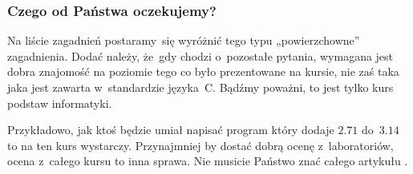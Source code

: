 \documentclass[10pt,t]{beamer}
\begin{document}
\begin{frame}
  \frametitle{Czego od Państwa oczekujemy?}


  Na liście zagadnień postaramy~się wyróżnić tego typu „powierzchowne”
  zagadnienia. Dodać należy, że~gdy chodzi o~pozostałe pytania, wymagana
  jest dobra znajomość na \alert{poziomie tego co było prezentowane na
    kursie}, nie zaś taka jaka jest zawarta w~standardzie języka~C.
  Bądźmy poważni, to jest tylko kurs podstaw informatyki.

  Przykładowo, jak ktoś będzie umiał napisać program który dodaje $2.71$
  do~$3.14$ to na \alert{ten} kurs wystarczy. Przynajmniej by dostać dobrą
  ocenę z~laboratoriów, ocena z~\alert{całego} kursu to inna sprawa.
  Nie musicie Państwo znać całego artykułu
  .


\end{frame}























































\printbibliography





\end{document}
